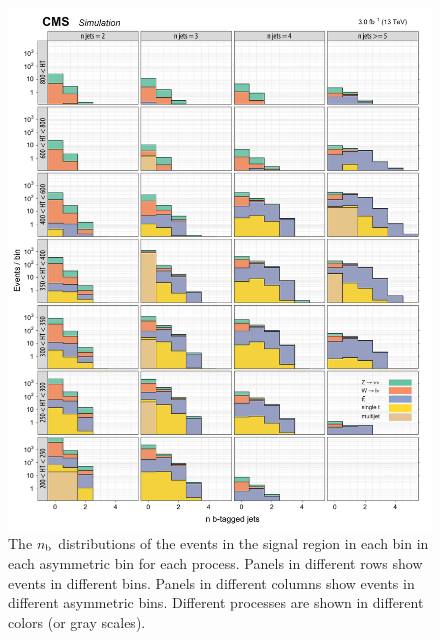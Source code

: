 \begin{figure}[!h]
\centering
\includegraphics[scale=0.95]{figures/kiplots/c150107_s150318_f015_nbjets_40}
\caption{The $n_{\text{b}}$ distributions of the events in the signal region in
each \scalht bin in each asymmetric \njet bin for each process. Panels
in different rows show events in different \scalht bins. Panels in
different columns show events in different asymmetric \njet bins.
Different processes are shown in different colors (or gray scales).}
\label{c150107_s150318_f015_nbjets_40}
\end{figure}

\clearpage

